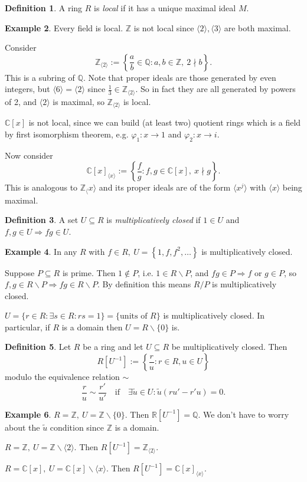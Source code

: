 \documentclass[a4paper]{article}
\theoremstyle{definition}
\newtheorem{defn}{Definition}[subsection]
\newtheorem{example}[defn]{Example}
\begin{document}
\begin{defn}
A ring $R$ is \textit{local} if it has a unique maximal ideal $M$.
\end{defn}
\begin{example}
Every field is local. $\mathbb Z$ is not local since $\langle2\rangle,\langle 3\rangle$ are both maximal.

Consider
\[
\mathbb Z_{\langle 2\rangle}:=\left\{ \frac{a}{b}\in\mathbb Q:a,b\in\mathbb Z,\ 2\nmid b \right\}.
\]
This is a subring of $\mathbb Q$. Note that proper ideals are those generated by even integers, but $\langle 6\rangle=\langle 2\rangle$ since $\frac13 \in \mathbb Z_{\langle 2\rangle}$. So in fact they are all generated by powers of 2, and $\langle 2\rangle$ is maximal, so $\mathbb Z_{\langle 2\rangle}$ is local.

$\mathbb C[x]$ is not local, since we can build (at least two) quotient rings which is a field by first isomorphism theorem, e.g. $\varphi_1 :x\rightarrow 1$ and $\varphi_2 :x\rightarrow i$.

Now consider
\[
\mathbb C[x]_{\langle x\rangle}:= \left\{ \frac{f}{g}:f,g\in\mathbb C[x],\ x\nmid g \right\}.
\]
This is analogous to $\mathbb Z_\langle x\rangle$ and its proper ideals are of the form $\langle x^j\rangle$ with $\langle x\rangle$ being maximal.
\end{example}
\begin{defn}
A set $U\subseteq R$ is \textit{multiplicatively closed} if $1\in U$ and $f,g\in U\Rightarrow fg\in U$.
\end{defn}
\begin{example}
In any $R$ with $f\in R,\ U=\left\{1,f,f^2,\ldots\right\}$ is multiplicatively closed. 

Suppose $P\subseteq R$ is prime. Then $1\notin P$, i.e. $1\in R\backslash P$, and $fg\in P\Rightarrow f$ or $g \in P$, so $f,g\in R\backslash P\Rightarrow fg\in R\backslash P$. By definition this means $R/P$ is multiplicatively closed.

$U=\{r\in R:\exists s\in R:rs=1\}=\{\text{units of }R\}$ is multiplicatively closed. In particular, if $R$ is a domain then $U=R\backslash\{0\}$ is.
\end{example}

\begin{defn}
Let $R$ be a ring and let $U\subseteq R$ be multiplicatively closed. Then
\[
R\left[U^{-1}\right]:=\left\{ \frac{r}{u}:r\in R,u\in U \right\}
\]
modulo the equivalence relation $\sim$
\[
\frac{r}{u}\sim\frac{r'}{u'} \quad\text{if}\quad \exists \tilde u \in U : \tilde u(ru'-r'u)=0.
\]
\end{defn}
\begin{example}
$R=\mathbb Z,\ U=\mathbb Z\backslash\{0\}$. Then $\mathbb R\left[U^{-1}\right]=\mathbb Q$. We don't have to worry about the $\tilde u$ condition since $\mathbb Z$ is a domain.

$R=\mathbb Z,\ U=\mathbb Z\backslash \langle 2\rangle$. Then $R[U^{-1}]=\mathbb Z_{\langle 2\rangle}$.

$R=\mathbb C[x],\ U=\mathbb C[x]\backslash \langle x\rangle$. Then $R[U^{-1}]=\mathbb C[x]_{\langle x\rangle}$.
\end{example}
\end{document}

